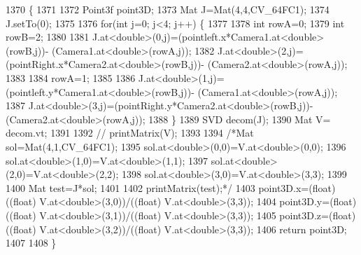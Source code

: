 \begin{DoxyCode}
1370                                                                                                      \{
1371 
1372     Point3f point3D;
1373     Mat J=Mat(4,4,CV\_64FC1);
1374     J.setTo(0);
1375 
1376     \textcolor{keywordflow}{for}(\textcolor{keywordtype}{int} j=0; j<4; j++) \{
1377 
1378         \textcolor{keywordtype}{int} rowA=0;
1379         \textcolor{keywordtype}{int} rowB=2;
1380 
1381         J.at<\textcolor{keywordtype}{double}>(0,j)=(pointleft.x*Camera1.at<\textcolor{keywordtype}{double}>(rowB,j))- (Camera1.at<\textcolor{keywordtype}{double}>(rowA,j));
1382         J.at<\textcolor{keywordtype}{double}>(2,j)=(pointRight.x*Camera2.at<\textcolor{keywordtype}{double}>(rowB,j))- (Camera2.at<\textcolor{keywordtype}{double}>(rowA,j));
1383 
1384         rowA=1;
1385 
1386         J.at<\textcolor{keywordtype}{double}>(1,j)=(pointleft.y*Camera1.at<\textcolor{keywordtype}{double}>(rowB,j))- (Camera1.at<\textcolor{keywordtype}{double}>(rowA,j));
1387         J.at<\textcolor{keywordtype}{double}>(3,j)=(pointRight.y*Camera2.at<\textcolor{keywordtype}{double}>(rowB,j))- (Camera2.at<\textcolor{keywordtype}{double}>(rowA,j));
1388     \}
1389     SVD decom(J);
1390     Mat V= decom.vt;
1391 
1392     \textcolor{comment}{// printMatrix(V);}
1393 
1394     \textcolor{comment}{/*Mat sol=Mat(4,1,CV\_64FC1);}
1395 \textcolor{comment}{        sol.at<double>(0,0)=V.at<double>(0,0);}
1396 \textcolor{comment}{        sol.at<double>(1,0)=V.at<double>(1,1);}
1397 \textcolor{comment}{        sol.at<double>(2,0)=V.at<double>(2,2);}
1398 \textcolor{comment}{        sol.at<double>(3,0)=V.at<double>(3,3);}
1399 \textcolor{comment}{}
1400 \textcolor{comment}{        Mat test=J*sol;}
1401 \textcolor{comment}{}
1402 \textcolor{comment}{        printMatrix(test);*/}
1403     point3D.x=(float) ((\textcolor{keywordtype}{float}) V.at<\textcolor{keywordtype}{double}>(3,0))/((float) V.at<\textcolor{keywordtype}{double}>(3,3));
1404     point3D.y=(float) ((\textcolor{keywordtype}{float}) V.at<\textcolor{keywordtype}{double}>(3,1))/((float) V.at<\textcolor{keywordtype}{double}>(3,3));
1405     point3D.z=(float) ((\textcolor{keywordtype}{float}) V.at<\textcolor{keywordtype}{double}>(3,2))/((float) V.at<\textcolor{keywordtype}{double}>(3,3));
1406     \textcolor{keywordflow}{return} point3D;
1407 
1408 \}
\end{DoxyCode}
\mbox{\label{classStereoCamera_aaef25d8723eefdbab6e27c348492126b}} 
